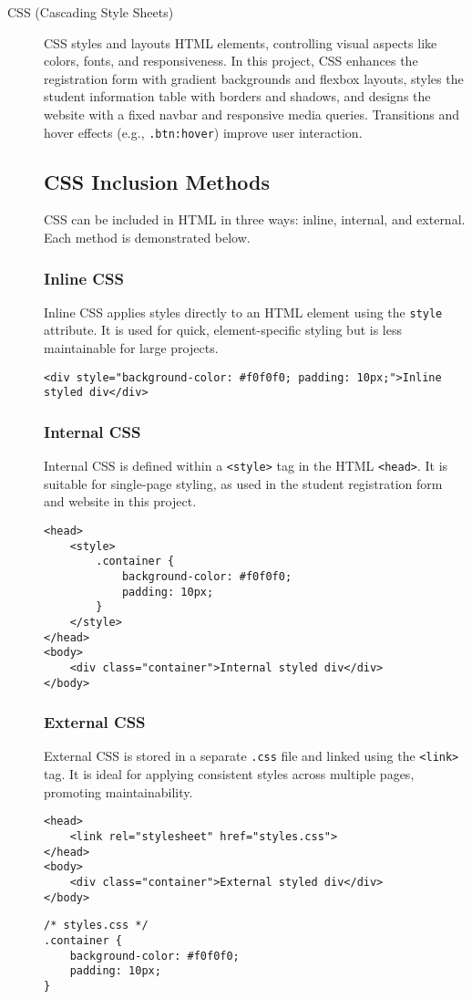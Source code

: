 \begin{description}
    \item[CSS (Cascading Style Sheets)] CSS styles and layouts HTML elements, controlling visual aspects like colors, fonts, and responsiveness. In this project, CSS enhances the registration form with gradient backgrounds and flexbox layouts, styles the student information table with borders and shadows, and designs the website with a fixed navbar and responsive media queries. Transitions and hover effects (e.g., \texttt{.btn:hover}) improve user interaction.

    \subsection{CSS Inclusion Methods}
    CSS can be included in HTML in three ways: inline, internal, and external. Each method is demonstrated below.

    \subsubsection{Inline CSS}
    Inline CSS applies styles directly to an HTML element using the \texttt{style} attribute. It is used for quick, element-specific styling but is less maintainable for large projects.
    \lstset{language=HTML}
    \begin{lstlisting}
<div style="background-color: #f0f0f0; padding: 10px;">Inline styled div</div>
    \end{lstlisting}

    \subsubsection{Internal CSS}
    Internal CSS is defined within a \texttt{<style>} tag in the HTML \texttt{<head>}. It is suitable for single-page styling, as used in the student registration form and website in this project.
    \lstset{language=HTML}
    \begin{lstlisting}
<head>
    <style>
        .container {
            background-color: #f0f0f0;
            padding: 10px;
        }
    </style>
</head>
<body>
    <div class="container">Internal styled div</div>
</body>
    \end{lstlisting}

    \subsubsection{External CSS}
    External CSS is stored in a separate \texttt{.css} file and linked using the \texttt{<link>} tag. It is ideal for applying consistent styles across multiple pages, promoting maintainability.
    \lstset{language=HTML}
    \begin{lstlisting}
<head>
    <link rel="stylesheet" href="styles.css">
</head>
<body>
    <div class="container">External styled div</div>
</body>
    \end{lstlisting}
    \lstset{language=CSS}
    \begin{lstlisting}
/* styles.css */
.container {
    background-color: #f0f0f0;
    padding: 10px;
}
    \end{lstlisting}


\end{description}
